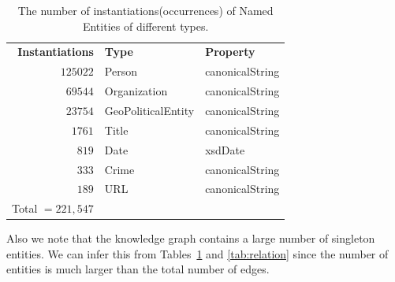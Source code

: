 \documentclass[paper=a4,fontsize=11pt]{scrartcl}
\numberwithin{equation}{section}    %
\numberwithin{figure}{section}      %
\numberwithin{table}{section}       %
\begin{document}
\begin{table}[htbp]
  \centering
  \begin{tabular}{r l l}
    \textbf{Instantiations} & \textbf{Type}      & \textbf{Property} \\
    $125022$                & Person             & canonicalString   \\
    $69544$                 & Organization       & canonicalString   \\
    $23754$                 & GeoPoliticalEntity & canonicalString   \\
    $1761$                  & Title              & canonicalString   \\
    $819$                   & Date               & xsdDate           \\
    $333$                   & Crime              & canonicalString   \\
    $189$                   & URL                & canonicalString   \\\cline{1-1}
    Total $= 221,547$                                                \\
  \end{tabular}
  \caption{The number of instantiations(occurrences) of Named Entities of different types.}
  \label{tab:type}
\end{table}
Also we note that the knowledge graph contains a large number of singleton entities.
We can infer this from Tables~\ref{tab:type} and \ref{tab:relation}
since the number of entities is much larger than the total number of edges.
\end{document}
